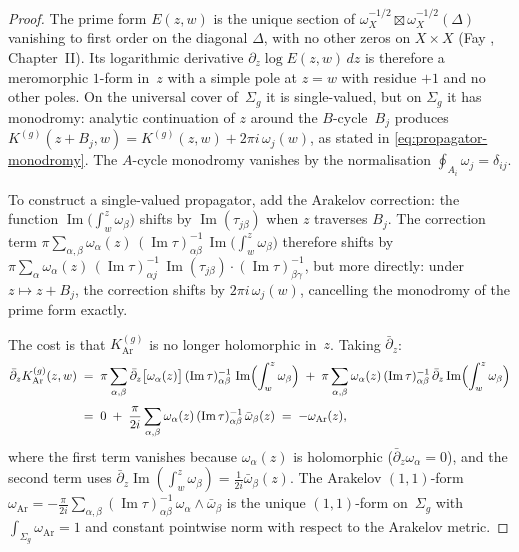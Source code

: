 \begin{proof}
The prime form $E(z,w)$ is the unique section of
$\omega_X^{-1/2} \boxtimes \omega_X^{-1/2}(\Delta)$ vanishing to
first order on the diagonal $\Delta$, with no other zeros on
$X \times X$ (Fay \cite{Fay73}, Chapter~II). Its logarithmic
derivative $\partial_z \log E(z,w)\,dz$ is therefore a meromorphic
$1$-form in~$z$ with a simple pole at $z = w$ with residue $+1$
and no other poles. On the universal cover of~$\Sigma_g$ it is
single-valued, but on $\Sigma_g$ it has monodromy: analytic
continuation of $z$ around the $B$-cycle~$B_j$ produces
$K^{(g)}(z + B_j, w) = K^{(g)}(z,w) + 2\pi i\, \omega_j(w)$,
as stated in \eqref{eq:propagator-monodromy}. The $A$-cycle
monodromy vanishes by the normalisation $\oint_{A_i}\omega_j = \delta_{ij}$.

To construct a single-valued propagator, add the Arakelov correction:
the function
$\operatorname{Im}\!\bigl(\int_w^z \omega_\beta\bigr)$
shifts by $\operatorname{Im}(\tau_{j\beta})$ when $z$ traverses
$B_j$. The correction term
$\pi\sum_{\alpha,\beta} \omega_\alpha(z)\,
(\operatorname{Im}\tau)^{-1}_{\alpha\beta}\,
\operatorname{Im}\!\bigl(\int_w^z \omega_\beta\bigr)$
therefore shifts by
$\pi \sum_\alpha \omega_\alpha(z)\,
(\operatorname{Im}\tau)^{-1}_{\alpha j}\,
\operatorname{Im}(\tau_{j\beta})\cdot
(\operatorname{Im}\tau)^{-1}_{\beta\gamma}$,
but more directly: under $z \mapsto z + B_j$, the
correction shifts by $2\pi i\, \omega_j(w)$, cancelling the
monodromy of the prime form exactly.

The cost is that $K^{(g)}_{\mathrm{Ar}}$ is no longer holomorphic
in~$z$. Taking $\bar\partial_z$:
\begin{align}\label{eq:dbar-arakelov}
 \bar\partial_z K^{(g)}_{\mathrm{Ar}}(z,w)
 &\;=\;
 \pi \sum_{\alpha,\beta}
 \bar\partial_z\bigl[\omega_\alpha(z)\bigr]\,
 (\operatorname{Im}\tau)^{-1}_{\alpha\beta}\,
 \operatorname{Im}\Bigl(\int_w^z \omega_\beta\Bigr)
 \;+\;
 \pi \sum_{\alpha,\beta}
 \omega_\alpha(z)\,
 (\operatorname{Im}\tau)^{-1}_{\alpha\beta}\,
 \bar\partial_z
 \operatorname{Im}\Bigl(\int_w^z \omega_\beta\Bigr)
 \notag\\[3pt]
 &\;=\;
 0 \;+\;
 \frac{\pi}{2i}
 \sum_{\alpha,\beta}
 \omega_\alpha(z)\,
 (\operatorname{Im}\tau)^{-1}_{\alpha\beta}\,
 \bar\omega_\beta(z)
 \;=\;
 -\omega_{\mathrm{Ar}}(z),
\end{align}
where the first term vanishes because $\omega_\alpha(z)$ is
holomorphic ($\bar\partial_z\omega_\alpha = 0$), and the second
term uses $\bar\partial_z\operatorname{Im}(\int_w^z\omega_\beta) =
\frac{1}{2i}\bar\omega_\beta(z)$. The Arakelov $(1,1)$-form
$\omega_{\mathrm{Ar}} = -\frac{\pi}{2i}\sum_{\alpha,\beta}
(\operatorname{Im}\tau)^{-1}_{\alpha\beta}\,
\omega_\alpha \wedge \bar\omega_\beta$ is the
unique $(1,1)$-form on~$\Sigma_g$ with
$\int_{\Sigma_g}\omega_{\mathrm{Ar}} = 1$ and constant
pointwise norm with respect to the Arakelov metric.


\end{proof}

